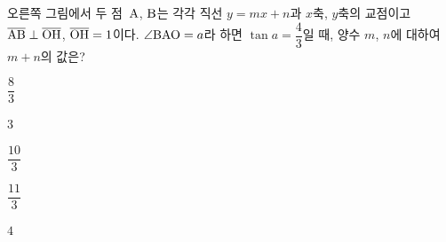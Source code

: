 \noindent\begin{minipage}[t]{0.58\linewidth}\vspace{0pt}\raggedright 오른쪽 그림에서 두 점~$\mathrm{A}$, $\mathrm{B}$는 각각 직선 $y=mx+n$과 $x$축, $y$축의 교점이고 $\overline{\mathrm{AB}}\perp\overline{\mathrm{OH}}$, $\overline{\mathrm{OH}}=1$이다. $\angle\mathrm{BAO}=a$라 하면 $\tan a=\dfrac{4}{3}$일 때, 양수 $m$, $n$에 대하여 $m+n$의 값은? \end{minipage}\hfill\begin{minipage}[t]{0.4\linewidth}\vspace{0pt}\centering \resizebox{\ifdim\width>\linewidth\linewidth\else\width\fi}{!}{}\end{minipage}\par
\begin{choices32}{\rule[-3ex]{0pt}{8ex}$\dfrac{8}{3}$}{\rule[-3ex]{0pt}{8ex}$3$}{\rule[-3ex]{0pt}{8ex}$\dfrac{10}{3}$}{\rule[-3ex]{0pt}{8ex}$\dfrac{11}{3}$}{\rule[-3ex]{0pt}{8ex}$4$}\end{choices32}
